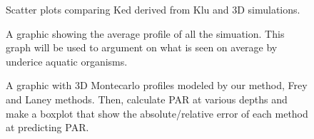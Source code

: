 \documentclass[12pt,a4paper]{scrartcl}
\begin{document}
    \clearpage
    \newpage

    \begin{figure}[ht]
        \centering
        \caption{Scatter plots comparing Ked derived from Klu and 3D simulations.}
    \end{figure}

    \clearpage
    \newpage

    \begin{figure}[ht]
        \centering
        \caption{A graphic showing the average profile of all the simuation. This graph will be used to argument on what is seen on average by underice aquatic organisms.}
    \end{figure}

    \clearpage
    \newpage

    \begin{figure}[ht]
        \centering
        \caption{A graphic with 3D Montecarlo profiles modeled by our method, Frey and Laney methods. Then, calculate PAR at various depths and make a boxplot that show the absolute/relative error of each method at predicting PAR.}
    \end{figure}

    
\end{document}
